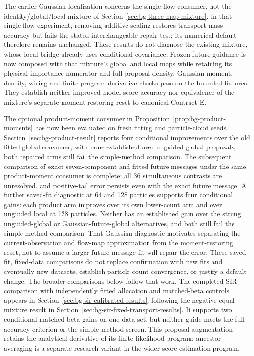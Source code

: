 \documentclass[11pt]{article}
\begin{document}
The earlier Gaussian localization concerns the single-flow consumer, not the
identity/global/local mixture of Section~\ref{sec:bg-three-map-mixture}. In
that single-flow experiment, removing additive scaling restores transport
mass accuracy but fails the stated interchangeable-repair test; its numerical
default therefore remains unchanged. These results do not diagnose the
existing mixture, whose local bridge already uses conditional covariance.
Frozen future guidance is now composed with that mixture's global and local
maps while retaining its physical importance numerator and full proposal
density. Gaussian moment, density, wiring and finite-program derivative checks
pass on the bounded fixtures. They establish neither improved model-score
accuracy nor equivalence of the mixture's separate moment-restoring reset to
canonical Contract E.

The optional product-moment consumer in
Proposition~\ref{prop:bg-product-moments} has now been evaluated on fresh
fitting and particle-cloud seeds. Section~\ref{sec:bg-product-result} reports
four conditional improvements over the old fitted global consumer, with none
established over unguided global proposals; both repaired arms still fail the
simple-method comparison. The subsequent comparison of exact seven-component
and fitted future messages under the same product-moment consumer is complete:
all 36 simultaneous contrasts are unresolved, and positive-tail error persists
even with the exact future message. A further saved-fit diagnostic at 64 and
128 particles supports four conditional gains: each product arm improves over
its own lower-count arm and over unguided local at 128 particles. Neither has
an established gain over the strong unguided-global or Gaussian-future-global
alternatives, and both still fail the simple-method comparison. That Gaussian
diagnostic motivates separating the current-observation and flow-map approximation
from the moment-restoring reset, not to assume a larger future-message fit
will repair the error. These saved-fit, fixed-data comparisons do not replace
confirmation with new fits and eventually new datasets, establish
particle-count convergence, or justify a default change. The broader
comparisons below follow that work. The completed SIR comparison with
independently fitted allocation and matched-beta controls appears in
Section~\ref{sec:bg-sir-calibrated-results}, following the negative
equal-mixture result in Section~\ref{sec:bg-sir-fixed-transport-results}.
It supports two conditional matched-beta gains on one data set, but neither
guide meets the full accuracy criterion or the simple-method screen.
This proposal augmentation retains the
analytical derivative of its finite likelihood program; ancestor averaging
is a separate research variant in the wider score-estimation program.
\end{document}
